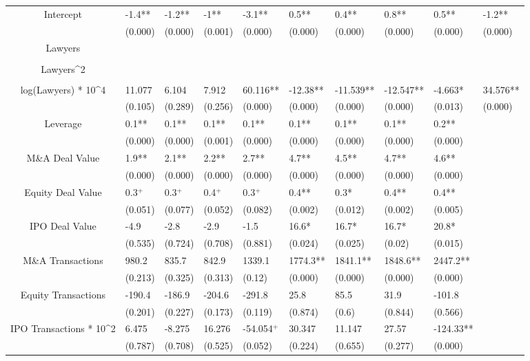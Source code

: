 \documentclass{article}
\begin{document}
\begin{table}[H]
\begin{tabular}{|clllllllll|}
Intercept & -1.4** & -1.2** & -1** & -3.1** & 0.5** & 0.4** & 0.8** & 0.5** & -1.2** \\
   & (0.000) & (0.000) & (0.001) & (0.000) & (0.000) & (0.000) & (0.000) & (0.000) & (0.000) \\
  Lawyers &  &  &  &  &  &  &  &  &  \\
   &  &  &  &  &  &  &  &  &  \\
  Lawyers^2 &  &  &  &  &  &  &  &  &  \\
   &  &  &  &  &  &  &  &  &  \\
  log(Lawyers) * 10^4 & 11.077 & 6.104 & 7.912 & 60.116** & -12.38** & -11.539** & -12.547** & -4.663* & 34.576** \\
   & (0.105) & (0.289) & (0.256) & (0.000) & (0.000) & (0.000) & (0.000) & (0.013) & (0.000) \\
  Leverage & 0.1** & 0.1** & 0.1** & 0.1** & 0.1** & 0.1** & 0.1** & 0.2** &  \\
   & (0.000) & (0.000) & (0.001) & (0.000) & (0.000) & (0.000) & (0.000) & (0.000) &  \\
  M\&A Deal Value & 1.9** & 2.1** & 2.2** & 2.7** & 4.7** & 4.5** & 4.7** & 4.6** &  \\
   & (0.000) & (0.000) & (0.000) & (0.000) & (0.000) & (0.000) & (0.000) & (0.000) &  \\
  Equity Deal Value & 0.3$^{+}$ & 0.3$^{+}$ & 0.4$^{+}$ & 0.3$^{+}$ & 0.4** & 0.3* & 0.4** & 0.4** &  \\
   & (0.051) & (0.077) & (0.052) & (0.082) & (0.002) & (0.012) & (0.002) & (0.005) &  \\
  IPO Deal Value & -4.9 & -2.8 & -2.9 & -1.5 & 16.6* & 16.7* & 16.7* & 20.8* &  \\
   & (0.535) & (0.724) & (0.708) & (0.881) & (0.024) & (0.025) & (0.02) & (0.015) &  \\
  M\&A Transactions & 980.2 & 835.7 & 842.9 & 1339.1 & 1774.3** & 1841.1** & 1848.6** & 2447.2** &  \\
   & (0.213) & (0.325) & (0.313) & (0.12) & (0.000) & (0.000) & (0.000) & (0.000) &  \\
  Equity Transactions & -190.4 & -186.9 & -204.6 & -291.8 & 25.8 & 85.5 & 31.9 & -101.8 &  \\
   & (0.201) & (0.227) & (0.173) & (0.119) & (0.874) & (0.6) & (0.844) & (0.566) &  \\
  IPO Transactions * 10^2 & 6.475 & -8.275 & 16.276 & -54.054$^{+}$ & 30.347 & 11.147 & 27.57 & -124.33** &  \\
   & (0.787) & (0.708) & (0.525) & (0.052) & (0.224) & (0.655) & (0.277) & (0.000) &  \\

\end{tabular}
\end{table}
\end{document}
